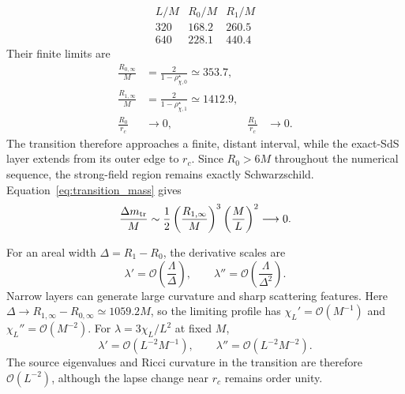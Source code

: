 \documentclass[
 aps,
 prd,
 reprint,
 superscriptaddress,
 nofootinbib,
 longbibliography
]{revtex4-2}
\begin{document}
\begin{equation}
\begin{array}{c|cc}
 L/M & R_0/M & R_1/M\\ \hline
 320 &168.2&260.5\\
 640 &228.1&440.4
\end{array}
 \label{eq:fixed_angle_transition_radii}
\end{equation}
Their finite limits are
\begin{equation}
\begin{aligned}
 \frac{R_{0,\infty}}{M}
 &=\frac{2}{1-\rho_{\chi,0}^\star}\simeq353.7,\\
 \frac{R_{1,\infty}}{M}
 &=\frac{2}{1-\rho_{\chi,1}^\star}\simeq1412.9,\\
 \frac{R_0}{r_c}&\longrightarrow0,
 &\frac{R_1}{r_c}&\longrightarrow0.
\end{aligned}
 \label{eq:transition_radii_limit}
\end{equation}
The transition therefore approaches a finite, distant interval, while the
exact-SdS layer extends from its outer edge to $r_c$.  Since $R_0>6M$
throughout the numerical sequence, the strong-field region remains exactly
Schwarzschild.  Equation~\eqref{eq:transition_mass} gives
\begin{equation}
 \frac{\Delta m_{\rm tr}}{M}
 \sim\frac12\left(\frac{R_{1,\infty}}{M}\right)^3
 \left(\frac{M}{L}\right)^2\longrightarrow0.
 \label{eq:transition_mass_fixed_angle_family}
\end{equation}

For an areal width $\Delta=R_1-R_0$, the derivative scales are
\begin{equation}
 \lambda'=\mathcal O\!\left(\frac{\Lambda}{\Delta}\right),
 \qquad
 \lambda''=\mathcal O\!\left(\frac{\Lambda}{\Delta^2}\right).
 \label{eq:transition_derivative_scales}
\end{equation}
Narrow layers can generate large curvature and sharp scattering features.
Here $\Delta\to R_{1,\infty}-R_{0,\infty}\simeq1059.2M$, so the limiting
profile has $\chi_L'=\mathcal O(M^{-1})$ and
$\chi_L''=\mathcal O(M^{-2})$.  For $\lambda=3\chi_L/L^2$ at fixed $M$,
\begin{equation}
 \lambda'=\mathcal O(L^{-2}M^{-1}),
 \qquad
 \lambda''=\mathcal O(L^{-2}M^{-2}).
 \label{eq:transition_width_floored_derivative_scales}
\end{equation}
The source eigenvalues and Ricci curvature in the transition are therefore
$\mathcal O(L^{-2})$, although the lapse change near $r_c$ remains order
unity.
\end{document}
